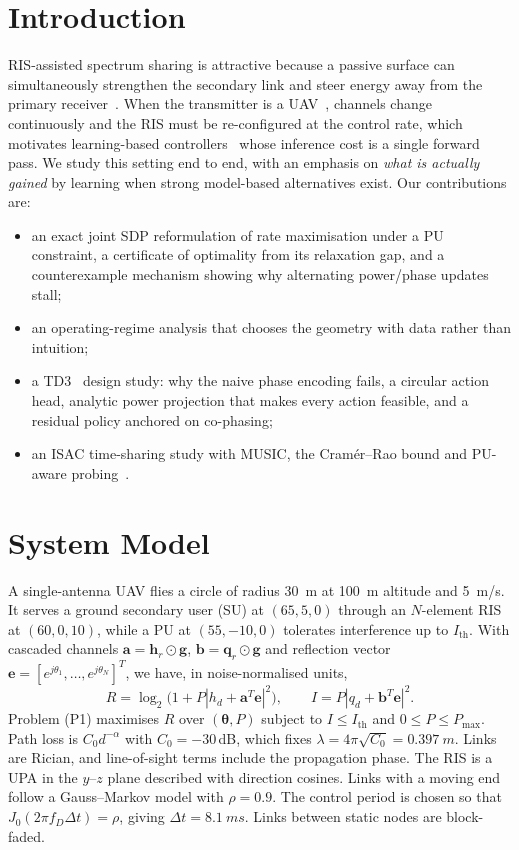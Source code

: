 \documentclass[conference]{IEEEtran}
\newcommand{\e}{\mathbf{e}}
\newcommand{\Ith}{I_{\mathrm{th}}}
\newcommand{\Pmax}{P_{\max}}
\begin{document}
\section{Introduction}
RIS-assisted spectrum sharing is attractive because a passive surface can simultaneously strengthen the secondary link and steer energy away from the primary receiver~\cite{wu2019}. When the transmitter is a UAV~\cite{zeng2016}, channels change continuously and the RIS must be re-configured at the control rate, which motivates learning-based controllers~\cite{huang2020} whose inference cost is a single forward pass. We study this setting end to end, with an emphasis on \emph{what is actually gained} by learning when strong model-based alternatives exist. Our contributions are:
\begin{itemize}
\item an exact joint SDP reformulation of rate maximisation under a PU constraint, a certificate of optimality from its relaxation gap, and a counterexample mechanism showing why alternating power/phase updates stall;
\item an operating-regime analysis that chooses the geometry with data rather than intuition;
\item a TD3~\cite{fujimoto2018} design study: why the naive phase encoding fails, a circular action head, analytic power projection that makes every action feasible, and a residual policy anchored on co-phasing;
\item an ISAC time-sharing study with MUSIC, the Cram\'er--Rao bound and PU-aware probing~\cite{liu2022}.
\end{itemize}

\section{System Model}
A single-antenna UAV flies a circle of radius \SI{30}{m} at \SI{100}{m} altitude and \SI{5}{m/s}. It serves a ground secondary user (SU) at $(65,5,0)$ through an $N$-element RIS at $(60,0,10)$, while a PU at $(55,-10,0)$ tolerates interference up to $\Ith$. With cascaded channels $\mathbf{a}=\mathbf{h}_r\odot\mathbf{g}$, $\mathbf{b}=\mathbf{q}_r\odot\mathbf{g}$ and reflection vector $\e=[e^{j\theta_1},\dots,e^{j\theta_N}]^T$, we have, in noise-normalised units,
\begin{equation}
R=\log_2\!\big(1+P|h_d+\mathbf{a}^T\e|^2\big),\qquad I=P|q_d+\mathbf{b}^T\e|^2 .
\end{equation}
Problem (P1) maximises $R$ over $(\bm\theta,P)$ subject to $I\le \Ith$ and $0\le P\le \Pmax$. Path loss is $C_0d^{-\alpha}$ with $C_0=-30$\,dB, which fixes $\lambda=4\pi\sqrt{C_0}=\SI{0.397}{m}$. Links are Rician, and line-of-sight terms include the propagation phase. The RIS is a UPA in the $y$--$z$ plane described with direction cosines. Links with a moving end follow a Gauss--Markov model with $\rho=0.9$. The control period is chosen so that $J_0(2\pi f_D\Delta t)=\rho$, giving $\Delta t=\SI{8.1}{ms}$. Links between static nodes are block-faded.
\end{document}

